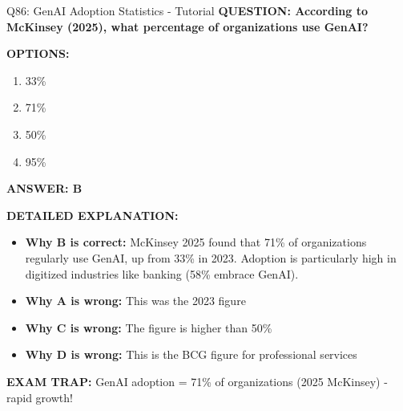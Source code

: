 \documentclass[8pt]{beamer}
\begin{document}
	\begin{frame}{Q86: GenAI Adoption Statistics - Tutorial}
		\fontsize{6.5}{7.5}\selectfont
		\textbf{QUESTION: According to McKinsey (2025), what percentage of organizations use GenAI?}
		
		\vspace{0.1cm}
		\textbf{OPTIONS:}
		\begin{enumerate}
			\item 33\%
			\item 71\%
			\item 50\%
			\item 95\%
		\end{enumerate}
		
		\vspace{0.1cm}
		\textcolor{myblue}{\textbf{ANSWER: B}}
		
		\vspace{0.1cm}
		\textbf{DETAILED EXPLANATION:}
		\begin{itemize}
			\item \textbf{Why B is correct:} McKinsey 2025 found that 71\% of organizations regularly use GenAI, up from 33\% in 2023. Adoption is particularly high in digitized industries like banking (58\% embrace GenAI).
			\item \textbf{Why A is wrong:} This was the 2023 figure
			\item \textbf{Why C is wrong:} The figure is higher than 50\%
			\item \textbf{Why D is wrong:} This is the BCG figure for professional services
		\end{itemize}
		
		\textcolor{myred}{\textbf{EXAM TRAP:}} GenAI adoption = \textcolor{myblue}{71\% of organizations} (2025 McKinsey) - rapid growth!
	\end{frame}
	
\end{document}
